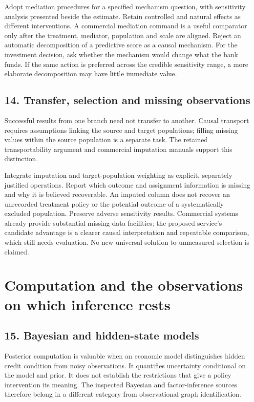 Adopt mediation procedures for a specified mechanism question, with sensitivity
analysis presented beside the estimate. Retain controlled and natural effects
as different interventions. A commercial mediation command is a useful
comparator only after the treatment, mediator, population and scale are aligned.
\citep{exec13_ci_stata_mediate,exec20_med_stata_multiple}
Reject an automatic decomposition of a predictive score as a causal mechanism.
For the investment decision, ask whether the mechanism would change what the
bank funds. If the same action is preferred across the credible sensitivity
range, a more elaborate decomposition may have little immediate value.

\subsection{14. Transfer, selection and missing observations}
Successful results from one branch need not transfer to another. Causal
transport requires assumptions linking the source and target populations;
filling missing values within the source population is a separate task.
The retained transportability argument and commercial imputation manuals
support this distinction.
\citep{pearltransport2014,exec21_transport_stata_mi,
exec21_transport_sas_mi_intro,exec21_transport_sas_mianalyze_intro}

Integrate imputation and target-population weighting as explicit, separately
justified operations. Report which outcome and assignment information is
missing and why it is believed recoverable. An imputed column does not recover
an unrecorded treatment policy or the potential outcome of a systematically
excluded population. Preserve adverse sensitivity results. Commercial systems
already provide substantial missing-data facilities; the proposed service's
candidate advantage is a clearer causal interpretation and repeatable
comparison, which still needs evaluation. No new universal solution to
unmeasured selection is claimed.

\section{Computation and the observations on which inference rests}

\subsection{15. Bayesian and hidden-state models}
Posterior computation is valuable when an economic model distinguishes hidden
credit condition from noisy observations. It quantifies uncertainty conditional
on the model and prior. It does not establish the restrictions that give a
policy intervention its meaning. The inspected Bayesian and factor-inference
sources therefore belong in a different category from observational graph
identification.
\citep{exec23_pymc_sources,exec25_bsw_stan,exec24_libdai_source,
exec22_state_stata_bayesmh,exec22_state_stata_sspace_post}

